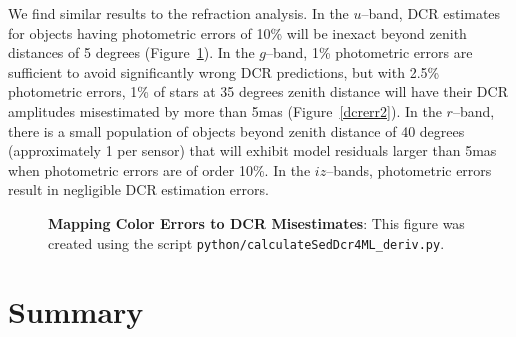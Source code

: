\documentclass[DM,toc]{lsstdoc}
\begin{document}
We find similar results to the refraction analysis.  In the $u$--band,
DCR estimates for objects having photometric errors of 10\% will be
inexact beyond zenith distances of 5 degrees (Figure~\ref{dcrerr}).
In the $g$--band, 1\% photometric errors are sufficient to avoid
significantly wrong DCR predictions, but with 2.5\% photometric
errors, 1\% of stars at 35 degrees zenith distance will have their DCR
amplitudes misestimated by more than 5mas (Figure~\ref{dcrerr2}).  In
the $r$--band, there is a small population of objects beyond zenith
distance of 40 degrees (approximately 1 per sensor) that will exhibit
model residuals larger than 5mas when photometric errors are of order
10\%.  In the $iz$--bands, photometric errors result in negligible DCR
estimation errors.

\begin{figure}[!t]
    \centering
    \caption{\textbf{Mapping Color Errors to DCR Misestimates}: This
      figure was created using the script
      \texttt{python/calculateSedDcr4ML\_deriv.py}.}
    \label{dcrerr}
\end{figure}

\section{Summary}

\end{document}
